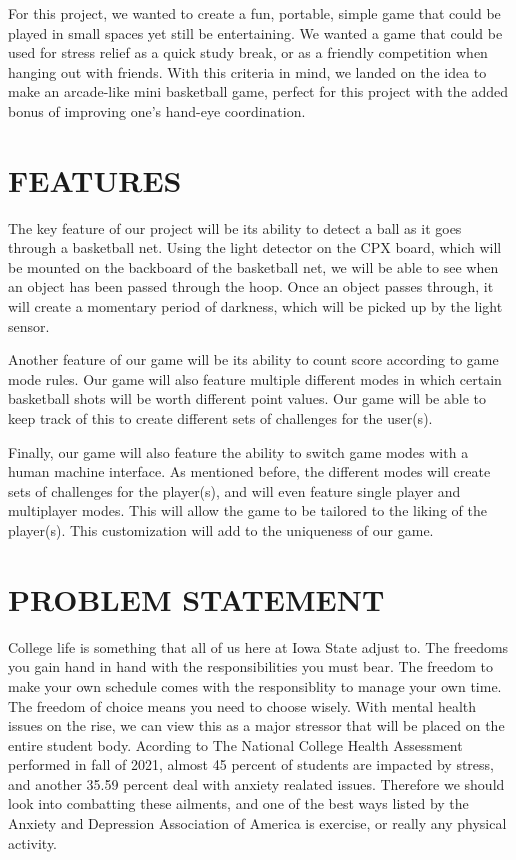 \documentclass[12pt]{article}
\begin{document}
For this project, we wanted to create a fun, portable, simple game that could be played in small spaces yet still be entertaining. We wanted a game that could be used for stress relief as a quick study break, or as a friendly competition when hanging out with friends. With this criteria in mind, we landed on the idea to make an arcade-like mini basketball game, perfect for this project with the added bonus of improving one's hand-eye coordination. 

\section{FEATURES}
The key feature of our project will be its ability to detect a ball as it goes through a basketball net. Using the light detector on the CPX board, which will be mounted on the backboard of the basketball net, we will be able to see when an object has been passed through the hoop. Once an object passes through, it will create a momentary period of darkness, which will be picked up by the light sensor. 
    
Another feature of our game will be its ability to count score according to game mode rules. Our game will also feature multiple different modes in which certain basketball shots will be worth different point values. Our game will be able to keep track of this to create different sets of challenges for the user(s). 
 
Finally, our game will also feature the ability to switch game modes with a human machine interface. As mentioned before, the different modes will create sets of challenges for the player(s), and will even feature single player and multiplayer modes. This will allow the game to be tailored to the liking of the player(s). This customization will add to the uniqueness of our game. 


\section{PROBLEM STATEMENT}
College life is something that all of us here at Iowa State adjust to. The freedoms you gain hand in hand with the responsibilities you must bear. The freedom to make your own schedule comes with the responsiblity to manage your own time. The freedom of choice means you need to choose wisely. With mental health issues on the rise, we can view this as a major stressor that will be placed on the entire student body. Acording to The National College Health Assessment performed in fall of 2021, almost 45 percent of students are impacted by stress, and another 35.59 percent deal with anxiety realated issues. Therefore we should look into combatting these ailments, and one of the best ways listed by the Anxiety and Depression Association of America is exercise, or really any physical activity.
\end{document}

